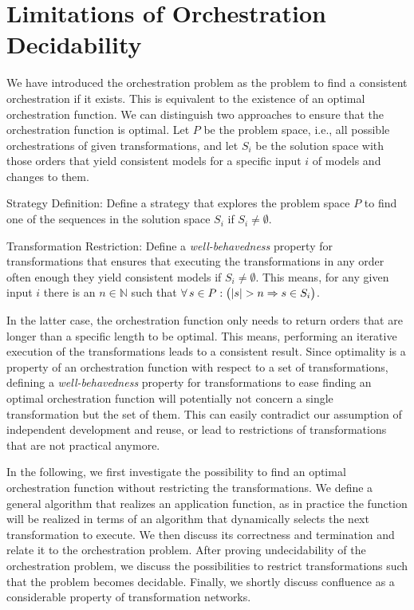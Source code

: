 \section{Limitations of Orchestration Decidability}
\label{chap:orchestration:decidability}

We have introduced the orchestration problem as the problem to find a consistent orchestration if it exists.
This is equivalent to the existence of an optimal orchestration function.
We can distinguish two approaches to ensure that the orchestration function is optimal.
Let $P$ be the problem space, i.e., all possible orchestrations of given transformations, and let $S_{i}$ be the solution space with those orders that yield consistent models for a specific input $i$ of models and changes to them.
\begin{properdescription}
    \item[Strategy Definition:] Define a strategy that explores the problem space $P$ to find one of the sequences in the solution space $S_{i}$ if $S_{i} \neq \emptyset$.
    \item[Transformation Restriction:] Define a \emph{well-behavedness} property for transformations that ensures that executing the transformations in any order often enough they yield consistent models if $S_{i} \neq \emptyset$. This means, for any given input $i$ there is an $n \in \mathbb{N}$ such that $\forall s \in P : \big( \abs{s} > n \Rightarrow s \in S_{i} \big)$.
\end{properdescription}

In the latter case, the orchestration function only needs to return orders that are longer than a specific length to be optimal.
This means, performing an iterative execution of the transformations leads to a consistent result.
Since optimality is a property of an orchestration function with respect to a set of transformations, defining a \emph{well-behavedness} property for transformations to ease finding an optimal orchestration function will potentially not concern a single transformation but the set of them.
This can easily contradict our assumption of independent development and reuse, or lead to restrictions of transformations that are not practical anymore.

In the following, we first investigate the possibility to find an optimal orchestration function without restricting the transformations.
We define a general algorithm that realizes an application function, as in practice the function will be realized in terms of an algorithm that dynamically selects the next transformation to execute.
We then discuss its correctness and termination and relate it to the orchestration problem.
After proving undecidability of the orchestration problem, we discuss the possibilities to restrict transformations such that the problem becomes decidable.
Finally, we shortly discuss confluence as a considerable property of transformation networks.


